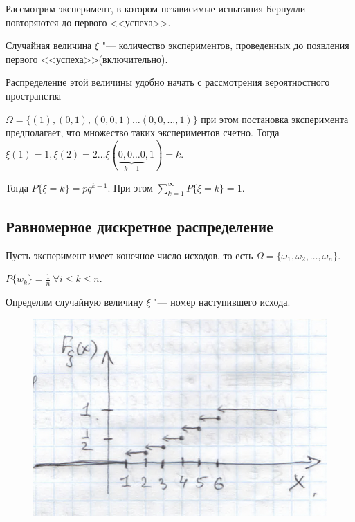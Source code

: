 Рассмотрим эксперимент, в котором независимые
испытания Бернулли повторяются до первого
<<успеха>>.

Случайная величина $\xi$ "--- количество экспериментов,
проведенных до появления первого <<успеха>>(включительно).

Распределение этой величины удобно начать с рассмотрения
вероятностного пространства

$\Omega = \{(1), (0, 1), (0, 0, 1) \dots (0, 0, \dots, 1)\}$
при этом постановка эксперимента предполагает, что множество
таких экспериментов счетно.
Тогда $\xi(1) = 1, \xi(2) = 2 \dots \xi(\underbrace{0, 0 \dots 0}_{k - 1}, 1) = k$.

Тогда $P\{\xi = k\} = pq^{k - 1}$.
При этом $\sum\limits_{k = 1}^\infty P\{\xi = k\} = 1$.

\subsection{Равномерное дискретное распределение}

Пусть эксперимент имеет конечное число исходов,
то есть $\Omega = \{\omega_1, \omega_2, \dots, \omega_n\}$.

$P\{w_k\} = \frac{1}{n} ~ \forall i \leq k \leq n$.

Определим случайную величину $\xi$ "--- номер наступившего
исхода.

\begin{figure}[H]
    \centering
    \includegraphics[scale=0.5]{images/ravnomern.png}
\end{figure}

